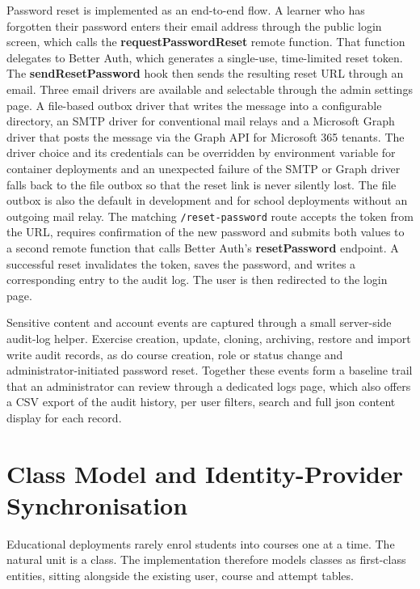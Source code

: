 Password reset is implemented as an end-to-end flow. A learner who has forgotten their password enters their email address 
through the public login screen, which calls the \textbf{requestPasswordReset} remote function. That function 
delegates to Better Auth, which generates a single-use, time-limited reset token.
The \textbf{sendResetPassword} hook then sends the resulting reset URL through an email. 
Three email drivers are available and selectable through the admin settings page. A file-based outbox driver that writes
the message into a configurable directory, an SMTP driver for conventional mail relays and a Microsoft Graph driver that 
posts the message via the Graph API for Microsoft 365 tenants.
The driver choice and its credentials can be overridden by environment variable for container deployments and an unexpected 
failure of the SMTP or Graph driver falls back to the file outbox so that the reset link is never silently lost.
The file outbox is also the default in development and for school deployments without an outgoing mail relay. 
The matching \texttt{/reset-password} route accepts the token from the URL, requires confirmation of the new password and 
submits both values to a second remote function that calls Better Auth's \textbf{resetPassword} endpoint. 
A successful reset invalidates the token, saves the password, and writes a 
corresponding entry to the audit log. 
The user is then redirected to the login page.

Sensitive content and account events are captured through a small server-side audit-log helper.
Exercise creation, update, cloning, archiving, restore and import write audit records, as do course creation, 
role or status change and administrator-initiated password reset.
Together these events form a baseline trail that an administrator can review through a dedicated logs page, 
which also offers a CSV export of the audit history, per user filters, search and full json content display for each record.


\section{Class Model and Identity-Provider Synchronisation}
\label{sec:class-model}
Educational deployments rarely enrol students into courses one at a time. The natural unit is a class.
The implementation therefore models classes as first-class entities, sitting alongside the existing user, 
course and attempt tables.

